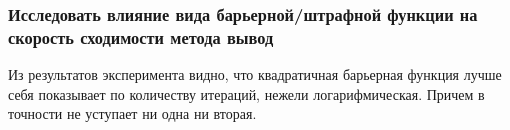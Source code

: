\documentclass[12pt,pdf,hyperref={unicode}]{beamer}
\begin{document}
\begin{frame}
\frametitle{Исследовать влияние вида барьерной/штрафной функции на скорость сходимости метода вывод}
Из результатов эксперимента видно, что квадратичная барьерная функция лучше себя показывает по количеству итераций, нежели логарифмическая. Причем в точности не уступает ни одна ни вторая.

\end{frame}
\end{document}
